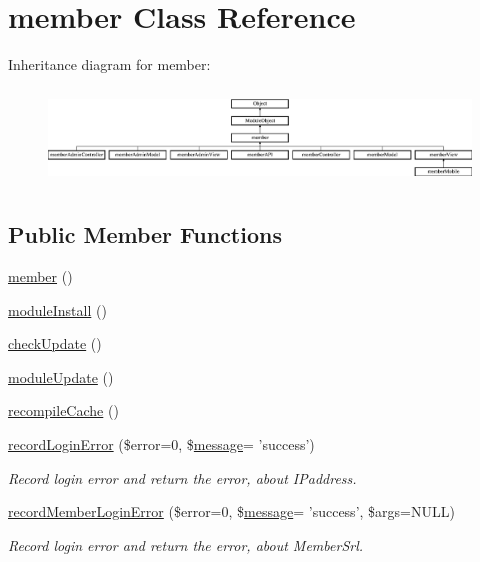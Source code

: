 \hypertarget{classmember}{\section{member Class Reference}
\label{classmember}
}
Inheritance diagram for member\+:\begin{figure}[H]
\begin{center}
\leavevmode
\includegraphics[height=2.580645cm]{classmember}
\end{center}
\end{figure}
\subsection*{Public Member Functions}
\begin{DoxyCompactItemize}
\item 
\hyperlink{classmember_a4153f13605eac8adf8dde89ee7d18c02}{member} ()
\item 
\hyperlink{classmember_a5834fa338d03eedcb5e84bb8ccac305b}{module\+Install} ()
\item 
\hyperlink{classmember_ad28f96bfab17efa94a9f2607a8b42a3d}{check\+Update} ()
\item 
\hyperlink{classmember_a72b7382e568644ccadb69b67e4504086}{module\+Update} ()
\item 
\hyperlink{classmember_ab5bc32f3821f7cba98e34703679c69ee}{recompile\+Cache} ()
\item 
\hyperlink{classmember_a557d0a329f29c5490a53c6e5a58dcab9}{record\+Login\+Error} (\$error=0, \$\hyperlink{classmessage}{message}= 'success')
\begin{DoxyCompactList}\small\item\em Record login error and return the error, about I\+Paddress. \end{DoxyCompactList}\item 
\hyperlink{classmember_a629cfb29393b629f0b39e4467a3d44d4}{record\+Member\+Login\+Error} (\$error=0, \$\hyperlink{classmessage}{message}= 'success', \$args=N\+U\+L\+L)
\begin{DoxyCompactList}\small\item\em Record login error and return the error, about Member\+Srl. \end{DoxyCompactList}\end{DoxyCompactItemize}
